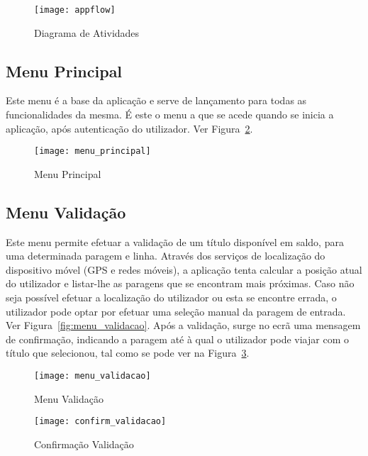 \begin{figure}[t]
  \begin{center}
    \leavevmode
    \texttt{[image: appflow]}
    \caption{Diagrama de Atividades}
    \label{fig:appflow}
  \end{center}
\end{figure}

\subsection{Menu Principal}

Este menu é a base da aplicação e serve de lançamento para todas as funcionalidades da mesma. É este o menu a que se acede quando se inicia a aplicação, após autenticação do utilizador. Ver Figura~\ref{fig:menu_principal}.

\begin{figure}[t]
  \begin{center}
    \leavevmode
    \texttt{[image: menu\_principal]}
    \caption{Menu Principal}
    \label{fig:menu_principal}
  \end{center}
\end{figure}

\subsection{Menu Validação}

Este menu permite efetuar a validação de um título disponível em saldo, para uma determinada paragem e linha. Através dos serviços de localização do dispositivo móvel (GPS e redes móveis), a aplicação tenta calcular a posição atual do utilizador e listar-lhe as paragens que se encontram mais próximas. Caso não seja possível efetuar a localização do utilizador ou esta se encontre errada, o utilizador pode optar por efetuar uma seleção manual da paragem de entrada. Ver Figura~\ref{fig:menu_validacao}. Após a validação, surge no ecrã uma mensagem de confirmação, indicando a paragem até à qual o utilizador pode viajar com o título que selecionou, tal como se pode ver na Figura~\ref{fig:confirm_validacao}.

\begin{figure}[ht]
\begin{minipage}[b]{0.45\linewidth}
\centering
\texttt{[image: menu\_validacao]}
    \caption{Menu Validação}
    \label{fig:menu_validacao}
\end{minipage}
\hspace{0.5cm}
\begin{minipage}[b]{0.45\linewidth}
\centering
    \texttt{[image: confirm\_validacao]}
    \caption{Confirmação Validação}
    \label{fig:confirm_validacao}
\end{minipage}
\end{figure}

